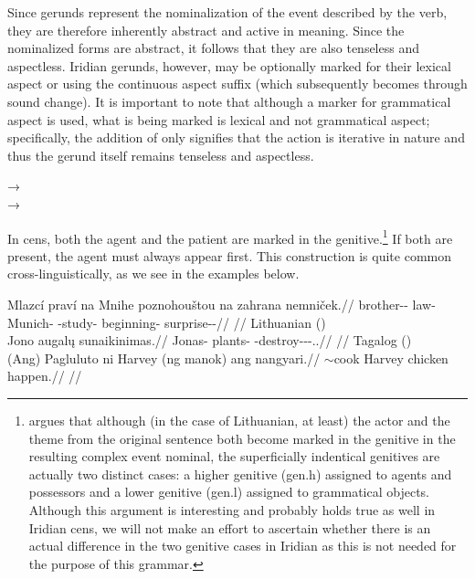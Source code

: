 Since gerunds represent the nominalization of the
event described by the verb, they are therefore inherently
abstract and active in meaning. Since the nominalized forms are abstract, it
follows that they are also tenseless and aspectless. Iridian gerunds, however,
may be optionally marked for their lexical aspect or 
 using the continuous aspect suffix 
(which subsequently becomes  through sound change). It is important to
note that although a marker for grammatical aspect is used,
what is being marked is lexical and not grammatical aspect; specifically, the
addition of  only signifies that the action is iterative in nature and
thus the gerund itself remains tenseless and aspectless.

\pex
    \a {} → \\
    \a {} → \\
\xe

In {\sc cen}s, both the agent and the patient are marked in the
genitive.\footnote{\textcite{serekaite2020} argues that although
(in the case of Lithuanian, at least) the actor and the theme from the original
sentence both become marked in the genitive in the resulting complex event
nominal, the superficially indentical genitives are actually two distinct cases:
a higher genitive ({\sc gen.h}) assigned to agents and possessors and a lower
genitive ({\sc gen.l}) assigned to grammatical objects. Although this argument
is interesting and probably holds true as well in Iridian {\sc cen}s, we will
not make an effort to ascertain whether there is an actual difference in the two
genitive cases in Iridian as this is not needed for the purpose of this
grammar.} If both are present, the agent must always appear first. This
construction is quite common cross-linguistically, as we see in the examples
below.

\pex
\a\begingl
    \gla Mlazcí praví na Mnihe poznohouštou na zahrana nemniček.//
    \glb brother-\Dim{}-\Gen{} law-\Gen{} \Loc{} Munich-\Acc{} \Ger{}-study-\Nz{} \Loc{} beginning-\Acc{} surprise-\Av{}-\Pf{}//
    \glft {}//
\endgl
\a Lithuanian (\cite[1]{serekaite2020})\\
\begingl
    \gla Jono augalų sunaikinimas.//
    \glb Jonas-\Gen{} plants-\Gen{} \Pfv{}-destroy-\Caus{}-\Nz-\Nom{}.\M{}.\Sg{}//
    \glft {}//
\endgl
\a Tagalog (\cite[22]{hsieh2019})\\
\begingl
    \gla (Ang) Pagluluto ni Harvey (ng manok) ang nangyari.//
    \glb \Nom{} \Ger{}$\sim$cook \Gen{} Harvey \Gen{} chicken \Nom{} happen.\Pfv{}//
    \glft {}//
\endgl
\xe

